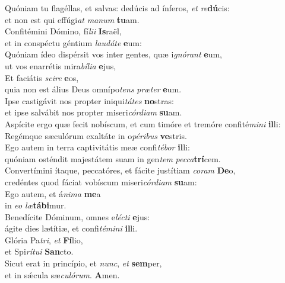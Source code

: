 \evenverse Quóniam tu flagéllas, et salvas: dedúcis ad ínferos, \textit{et} \textit{re}\textbf{dú}cis:~\*\\
\evenverse et non est qui effúgi\textit{at} \textit{ma}\textit{num} \textbf{tu}am.\\
\oddverse Confitémini Dómino, fí\textit{li}\textit{i} \textbf{Is}raël,~\*\\
\oddverse et in conspéctu géntium \textit{lau}\textit{dá}\textit{te} \textbf{e}um:\\
\evenverse Quóniam ídeo dispérsit vos inter gentes, quæ i\textit{gnó}\textit{rant} \textbf{e}um,~\*\\
\evenverse ut vos enarrétis mira\textit{bí}\textit{li}\textit{a} \textbf{e}jus,\\
\oddverse Et faciátis \textit{sci}\textit{re} \textbf{e}os,~\*\\
\oddverse quia non est álius Deus omnípo\textit{tens} \textit{præ}\textit{ter} \textbf{e}um.\\
\evenverse Ipse castigávit nos propter iniqui\textit{tá}\textit{tes} \textbf{no}stras:~\*\\
\evenverse et ipse salvábit nos propter miseri\textit{cór}\textit{di}\textit{am} \textbf{su}am.\\
\oddverse Aspícite ergo quæ fecit nobíscum, et cum timóre et tremóre confité\textit{mi}\textit{ni} \textbf{il}li:~\*\\
\oddverse Regémque sæculórum exaltáte in o\textit{pé}\textit{ri}\textit{bus} \textbf{ve}stris.\\
\evenverse Ego autem in terra captivitátis meæ confi\textit{té}\textit{bor} \textbf{il}li:~\*\\
\evenverse quóniam osténdit majestátem suam in gen\textit{tem} \textit{pec}\textit{ca}\textbf{trí}cem.\\
\oddverse Convertímini ítaque, peccatóres, et fácite justítiam \textit{co}\textit{ram} \textbf{De}o,~\*\\
\oddverse credéntes quod fáciat vobíscum miseri\textit{cór}\textit{di}\textit{am} \textbf{su}am:\\
\evenverse Ego autem, et á\textit{ni}\textit{ma} \textbf{me}a~\*\\
\evenverse in \textit{e}\textit{o} \textit{læ}\textbf{tá}\textbf{bi}mur.\\
\oddverse Benedícite Dóminum, omnes e\textit{lé}\textit{cti} \textbf{e}jus:~\*\\
\oddverse ágite dies lætítiæ, et confi\textit{té}\textit{mi}\textit{ni} \textbf{il}li.\\
\evenverse Glória Pa\textit{tri}, \textit{et} \textbf{Fí}lio,~\*\\
\evenverse et Spi\textit{rí}\textit{tu}\textit{i} \textbf{San}cto.\\
\oddverse Sicut erat in princípio, et \textit{nunc}, \textit{et} \textbf{sem}per,~\*\\
\oddverse et in sǽcula sæ\textit{cu}\textit{ló}\textit{rum}. \textbf{A}men.\\
